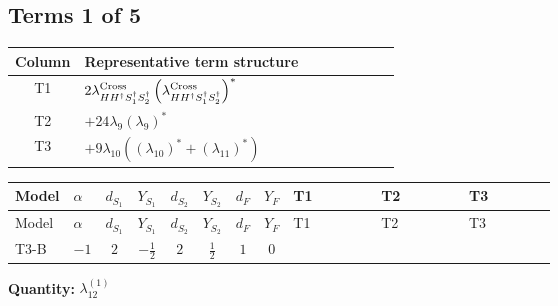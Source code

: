 \documentclass[8pt]{article}
\begin{document}
\begin{landscape}
\subsection*{Terms 1 of 5}
\begin{center}
\begin{tabular}{@{}c >{\raggedright\arraybackslash}p{0.82\linewidth}@{}}
\toprule
Column & Representative term structure \\
\midrule
T1 & \(\displaystyle 2 {\lambda_{H H^\dagger S_1^\dagger S_2^\dagger}^{\rm Cross}} \left({\lambda_{H H^\dagger S_1^\dagger S_2^\dagger}^{\rm Cross}}\right)^{*}\) \\
\midrule
T2 & \(\displaystyle +24 {\lambda_{9}} \left({\lambda_{9}}\right)^{*}\) \\
\midrule
T3 & \(\displaystyle +9 {\lambda_{10}} (\left({\lambda_{10}}\right)^{*}+\left({\lambda_{11}}\right)^{*})\) \\
\midrule
\bottomrule
\end{tabular}
\end{center}
\smallskip
\tiny
\begin{longtable}{@{}llcccccc >{\raggedright\arraybackslash}p{0.21\linewidth} >{\raggedright\arraybackslash}p{0.21\linewidth} >{\raggedright\arraybackslash}p{0.21\linewidth}@{}}
\toprule
Model & $\alpha$ & $d_{S_1}$ & $Y_{S_1}$ & $d_{S_2}$ & $Y_{S_2}$ & $d_F$ & $Y_F$ & T1 & T2 & T3 \\
\midrule
\endfirsthead
\toprule
Model & $\alpha$ & $d_{S_1}$ & $Y_{S_1}$ & $d_{S_2}$ & $Y_{S_2}$ & $d_F$ & $Y_F$ & T1 & T2 & T3 \\
\midrule
\endhead
T3-B & $-1$ & $2$ & $-\frac{1}{2}$ & $2$ & $\frac{1}{2}$ & $1$ & $0$ & \scriptsize\adjustbox{max width=\linewidth}{$\begin{gathered} 2 {\lambda_{H H^\dagger S_1^\dagger S_2^\dagger}^{\rm Cross}} \left({\lambda_{H H^\dagger S_1^\dagger S_2^\dagger}^{\rm Cross}}\right)^{*}\end{gathered}$} & \scriptsize\adjustbox{max width=\linewidth}{$\begin{gathered} +24 {\lambda_{9}} \left({\lambda_{9}}\right)^{*}\end{gathered}$} & \scriptsize\adjustbox{max width=\linewidth}{$\begin{gathered} +9 {\lambda_{10}} (\left({\lambda_{10}}\right)^{*}+\left({\lambda_{11}}\right)^{*}) \\ +9 {\lambda_{11}} (\left({\lambda_{10}}\right)^{*}+\left({\lambda_{11}}\right)^{*})\end{gathered}$} \\
\midrule
\bottomrule
\end{longtable}
\clearpage
\noindent\textbf{Quantity: }$\lambda_{12}^{(1)}$\par\smallskip

\end{landscape}
\end{document}
